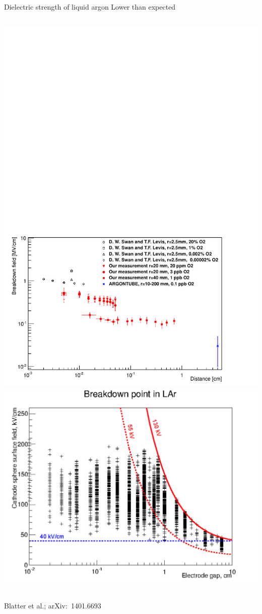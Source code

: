 \documentclass[]{beamer}
\newcommand*{\emphcol}{blue}
\begin{document}
\begin{frame}{Dielectric strength of liquid argon}{\color{\emphcol} Lower than expected}
	\begin{columns}[c]
		\centering
		\includegraphics[viewport=18 10 511 351, clip, width=\textwidth]{defence/breakdown_plot}
		\centering
		\includegraphics[width=\textwidth]{defence/breakdown_summary}
	\end{columns}
	\centering
	{\tiny Blatter et al.; arXiv:~1401.6693~\cite{breakdown_14}}
\end{frame}
\end{document}
